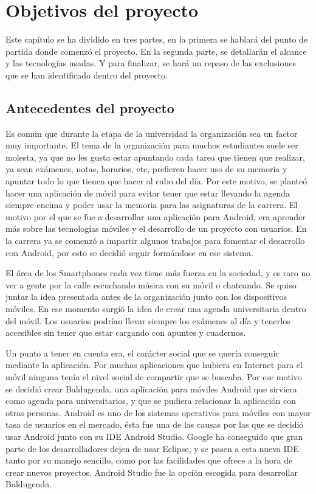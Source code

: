 \chapter{Objetivos del proyecto}
Este capítulo se ha dividido en tres partes, en la primera se hablará del punto de partida donde comenzó el proyecto. En la segunda parte, se detallarán el alcance y las tecnologías usadas. Y para finalizar, se hará un repaso de las exclusiones que se han identificado dentro del proyecto.
\section{Antecedentes del proyecto}
\label{secc:Antecedentes}
Es común que durante la etapa de la universidad la organización sea un factor muy importante. El tema de la organización para muchos estudiantes suele ser molesta, ya que no les gusta estar apuntando cada tarea que tienen que realizar, ya sean exámenes, notas, horarios, etc, prefieren hacer uso de su memoria y apuntar todo lo que tienen que hacer al cabo del día. Por este motivo, se planteó hacer una aplicación de móvil para evitar tener que estar llevando la agenda siempre encima y poder usar la memoria para las asignaturas de la carrera.
El motivo por el que se fue a desarrollar una aplicación para Android, era aprender más sobre las tecnologías móviles y el desarrollo de un proyecto con usuarios. En la carrera ya se comenzó a impartir algunos trabajos para fomentar el desarrollo con Android, por esto se decidió seguir formándose en ese sistema.

El área de los Smartphones cada vez tiene más fuerza en la sociedad, y es raro no ver a gente por la calle escuchando música con su móvil o chateando. Se quiso juntar la idea presentada antes de la organización junto con los dispositivos móviles. En ese momento surgió la idea de crear una agenda universitaria dentro del móvil. Los usuarios podrían llevar siempre los exámenes al día y tenerlos accesibles sin tener que estar cargando con apuntes y cuadernos.

Un punto a tener en cuenta era, el carácter social que se quería conseguir  mediante la aplicación. Por muchas aplicaciones que hubiera en Internet para el móvil ninguna tenía el nivel social de compartir que se buscaba. Por ese motivo se decidió crear Baldugenda, una aplicación para móviles Android que sirviera como agenda para universitarios, y que se pudiera relacionar la aplicación con otras personas. Android es uno de los sistemas operativos para móviles con mayor tasa de usuarios en el mercado, ésta fue una de las causas por las que se decidió usar Android junto con su  IDE Android Studio. Google ha conseguido que gran parte de los desarrolladores dejen de usar Eclipse, y se pasen a esta nueva IDE tanto por su manejo sencillo, como por las facilidades que ofrece a la hora de crear nuevos proyectos. Android Studio fue la opción escogida para desarrollar Baldugenda.  

